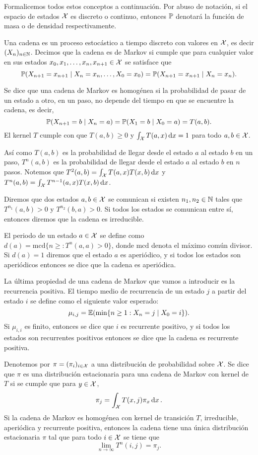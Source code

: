 Formalicemos todos estos conceptos a continuación. Por abuso de notación, si el espacio de estados \(\mathcal{X}\) es discreto o continuo, entonces \(\mathbb{P}\) denotará la función de masa o de densidad respectivamente.
\begin{definition}
	Una cadena es un proceso estocástico a tiempo discreto con valores en \(\mathcal{X}\), es decir \((X_n)_{n \in \mathbb{N}}\). Decimos que la cadena es de Markov si cumple que para cualquier valor en sus estados \(x_0, x_1, \dotsc, x_n, x_{n+1} \in \mathcal{X}\) se satisface que
	\[\mathbb{P}(X_{n+1} = x_{n+1} \mid X_n = x_n, \dotsc, X_0 = x_0) = \mathbb{P}(X_{n+1} = x_{n+1} \mid X_n = x_n).\]
\end{definition}
Se dice que una cadena de Markov es homogénea si la probabilidad de pasar de un estado a otro, en un paso, no depende del tiempo en que se encuentre la cadena, es decir,
\[\mathbb{P}(X_{n+1} = b \mid X_n = a) = \mathbb{P}(X_1 = b \mid X_0 = a) = T(a, b).\]
El kernel \(T\) cumple con que \(T(a, b) \geq 0\) y \(\int_{\mathcal{X}} T(a, x) \dd{x} = 1\) para todo \(a, b \in \mathcal{X}\).

Así como \(T(a, b)\) es la probabilidad de llegar desde el estado \(a\) al estado \(b\) en un paso, \(T^n(a, b)\) es la probabilidad de llegar desde el estado \(a\) al estado \(b\) en \(n\) pasos. Notemos que \(T^2(a,b) = \int_{\mathcal{X}} T(a, x) T(x, b) \dd{x}\) y \(T^n(a,b) = \int_{\mathcal{X}} T^{n-1}(a, x) T(x, b) \dd{x}\).

Diremos que dos estados \(a, b \in \mathcal{X}\) se comunican si existen \(n_1, n_2 \in \mathbb{N}\) tales que \(T^{n_1}(a, b) > 0\) y \(T^{n_2}(b, a) > 0\). Si todos los estados se comunican entre sí, entonces diremos que la cadena es irreducible.

El periodo de un estado \(a \in \mathcal{X}\) se define como \(d(a) = \mathrm{mcd}\{n \geq : T^n(a, a) > 0\}\), donde \(\mathrm{mcd}\) denota el máximo común divisor. Si \(d(a) = 1\) diremos que el estado \(a\) es aperiódico, y si todos los estados son aperiódicos entonces se dice que la cadena es aperiódica.

La última propiedad de una cadena de Markov que vamos a introducir es la recurrencia positiva. El tiempo medio de recurrencia de un estado \(j\) a partir del estado \(i\) se define como el siguiente valor esperado:
\[\mu_{i, j} = \mathbb{E}(\min\{n \geq 1 : X_n = j \mid X_0 = i\}).\]
Si \(\mu_{i, i}\) es finito, entonces se dice que \(i\) es recurrente positivo, y si todos los estados son recurrentes positivos entonces se dice que la cadena es recurrente positiva.

Denotemos por \(\pi = (\pi_i)_{i\in\mathcal{X}}\) a una distribución de probabilidad sobre \(\mathcal{X}\). Se dice que \(\pi\) es una distribución estacionaria para una cadena de Markov con kernel de \(T\) si se cumple que para \(y \in \mathcal{X}\),
\[\pi_j = \int_{\mathcal{X}}T(x, j) \pi_x \dd{x}.\]
Si la cadena de Markov es homogénea con kernel de transición \(T\), irreducible, aperiódica y recurrente positiva, entonces la cadena tiene una única distribución estacionaria \(\pi\) tal que para todo \(i \in \mathcal{X}\) se tiene que
\[\lim_{n \to \infty} T^n(i, j) = \pi_j.\]

